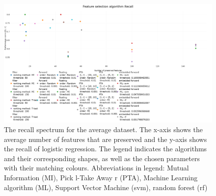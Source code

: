 \documentclass[10pt,a4paper]{article}
\begin{document}
\begin{figure}[H]
	\centering
	\includegraphics[angle=90,height=1.4\textwidth]{Recall_new.png}
	\caption{The recall spectrum for the average dataset. The x-axis shows the average number of features that are preserved and the y-axis shows the recall of logistic regression. The legend indicates the algorithms and their corresponding shapes, as well as the chosen parameters with their matching colours. Abbreviations in legend: Mutual Information (MI), Pick l-Take Away r (PTA), Machine Learning algorithm (ML), Support Vector Machine (svm), random forest (rf)}
	\label{fig:Avg_Recall_Spectrum}
\end{figure}
\end{document}
